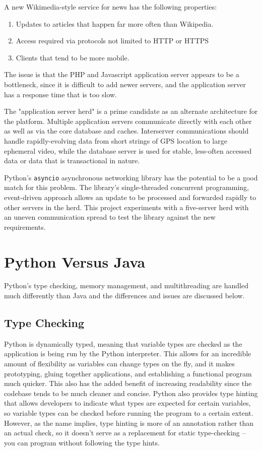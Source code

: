 A new Wikimedia-style service for news has the following properties:
\begin{enumerate}
  \item Updates to articles that happen far more often than Wikipedia.
  \item Access required via protocols not limited to HTTP or HTTPS
  \item Clients that tend to be more mobile.
\end{enumerate}

The issue is that the PHP and Javascript application server appears to be a bottleneck, since it is difficult to add newer servers, and the application server has a response time that is too slow.

The "application server herd" is a prime candidate as an alternate architecture for the platform. Multiple application servers communicate directly with each other as well as via the core database and caches. Interserver communications should handle rapidly-evolving data from short strings of GPS location to large ephemeral video, while the database server is used for stable, less-often accessed data or data that is transactional in nature.

Python's \texttt{asyncio} asynchronous networking library has the potential to be a good match for this problem. The library's single-threaded concurrent programming, event-driven approach allows an update to be processed and forwarded rapidly to other servers in the herd. This project experiments with a five-server herd with an uneven communication spread to test the library against the new requirements.

\section{Python Versus Java}
Python's type checking, memory management, and multithreading are handled much differently than Java and the differences and issues are discussed below.

\subsection{Type Checking}
Python is dynamically typed, meaning that variable types are checked as the application is being run by the Python interpreter. This allows for an incredible amount of flexibility as variables can change types on the fly, and it makes prototyping, gluing together applications, and establishing a functional program much quicker. This also has the added benefit of increasing readability since the codebase tends to be much cleaner and concise. Python also provides type hinting that allows developers to indicate what types are expected for certain variables, so variable types can be checked before running the program to a certain extent. However, as the name implies, type hinting is more of an annotation rather than an actual check, so it doesn't serve as a replacement for static type-checking -- you can program without following the type hints.


